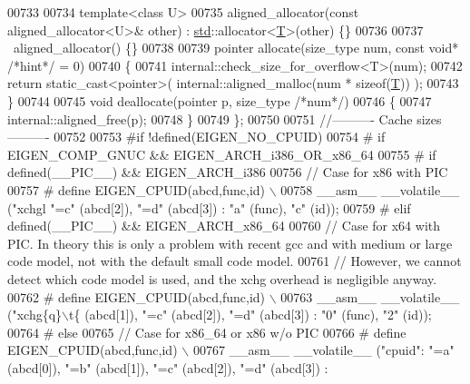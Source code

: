 \begin{DoxyCode}
{00733 
00734   \textcolor{keyword}{template}<\textcolor{keyword}{class} U>
00735   aligned\_allocator(\textcolor{keyword}{const} aligned\_allocator<U>& other) : \hyperlink{namespacestd}{std}::allocator<\hyperlink{group___sparse_core___module_class_eigen_1_1_triplet}{T}>(other) \{\}
00736 
00737   ~aligned\_allocator() \{\}
00738 
00739   pointer allocate(size\_type num, \textcolor{keyword}{const} \textcolor{keywordtype}{void}* \textcolor{comment}{/*hint*/} = 0)
00740   \{
00741     internal::check\_size\_for\_overflow<T>(num);
00742     \textcolor{keywordflow}{return} \textcolor{keyword}{static\_cast<}pointer\textcolor{keyword}{>}( internal::aligned\_malloc(num * \textcolor{keyword}{sizeof}(\hyperlink{group___sparse_core___module_class_eigen_1_1_triplet}{T})) );
00743   \}
00744 
00745   \textcolor{keywordtype}{void} deallocate(pointer p, size\_type \textcolor{comment}{/*num*/})
00746   \{
00747     internal::aligned\_free(p);
00748   \}
00749 \};
00750 
00751 \textcolor{comment}{//---------- Cache sizes ----------}
00752 
00753 \textcolor{preprocessor}{#if !defined(EIGEN\_NO\_CPUID)}
00754 \textcolor{preprocessor}{#  if EIGEN\_COMP\_GNUC && EIGEN\_ARCH\_i386\_OR\_x86\_64}
00755 \textcolor{preprocessor}{#    if defined(\_\_PIC\_\_) && EIGEN\_ARCH\_i386}
00756        \textcolor{comment}{// Case for x86 with PIC}
00757 \textcolor{preprocessor}{#      define EIGEN\_CPUID(abcd,func,id) \(\backslash\)}
00758 \textcolor{preprocessor}{         \_\_asm\_\_ \_\_volatile\_\_ ("xchgl %
       "=c" (abcd[2]), "=d" (abcd[3]) : "a" (func), "c" (id));}
00759 \textcolor{preprocessor}{#    elif defined(\_\_PIC\_\_) && EIGEN\_ARCH\_x86\_64}
00760        \textcolor{comment}{// Case for x64 with PIC. In theory this is only a problem with recent gcc and with medium or large
       code model, not with the default small code model.}
00761        \textcolor{comment}{// However, we cannot detect which code model is used, and the xchg overhead is negligible anyway.}
00762 \textcolor{preprocessor}{#      define EIGEN\_CPUID(abcd,func,id) \(\backslash\)}
00763 \textcolor{preprocessor}{        \_\_asm\_\_ \_\_volatile\_\_ ("xchg\{q\}\(\backslash\)t\{%
       (abcd[1]), "=c" (abcd[2]), "=d" (abcd[3]) : "0" (func), "2" (id));}
00764 \textcolor{preprocessor}{#    else}
00765        \textcolor{comment}{// Case for x86\_64 or x86 w/o PIC}
00766 \textcolor{preprocessor}{#      define EIGEN\_CPUID(abcd,func,id) \(\backslash\)}
00767 \textcolor{preprocessor}{         \_\_asm\_\_ \_\_volatile\_\_ ("cpuid": "=a" (abcd[0]), "=b" (abcd[1]), "=c" (abcd[2]), "=d" (abcd[3]) :
}}
\end{DoxyCode}
